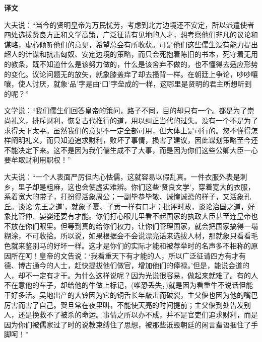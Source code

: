 \documentclass[12pt,UTF-8,openany,a4]{ctexbook}
\begin{document}
\newpage

\begin{Large}
    \noindent\textbf{译文}
\end{Large}


\vspace{1em}

\begin{large}
    \yiwen 
    大夫说：“当今的贤明皇帝为万民忧劳，考虑到北方边境还不安定，所以派遣使者四处选拔贤良方正和文学高策，广泛征请有见地的人才，想考察他们非凡的议论和谋略，虚心倾听他们的意见，希望总会有所收获。可是他们这些儒生没有能力提出超人的计谋和抗击匈奴、安定边境的策略，而只会死抱着陈旧的书本，死守着无用的教条，既不知道什么是该努力做的，什么是该舍弃不做的，也不懂得去适应形势的变化。议论问题无的放矢，就象膝盖痒了却去搔背一样。在朝廷上争论，吵吵嚷嚷，使人讨厌，就象‘品’字是由‘口’字垒成的一样，这哪里是贤明的君主所想听到的呢？”
    
    文学说：“我们儒生们回答皇帝的策问，路子不同，目的却只有一个。都是为了崇尚礼义，排斥财利，恢复古代推行的道，用以纠正当代的过失。没有一个不是为了求得天下太平。虽然我们的意见不一定全部可用，但大体上是可行的。您不懂得怎样阐明礼义，而只知道追求财利，败坏了事情，损害了建议，因此谋划策略至今还不能决定下来。这不是因为我们儒生成不了大事，而是因为你们这些公卿大臣一心要牟取财利用职权！”
    
    大夫说：“一个人表面严厉但内心怯儒，这就容易以假乱真。一件衣服外表是刺乡，里子却是粗麻，这也会使虚实难辨。你们这些‘贤良文学’，穿着宽大的衣服，系着宽大的带子，打扮得活象周公；一副毕恭毕敬、诚惶诚恐的样子，又活象孔丘。谈论‘先王之道’，就象子夏、子贡一样有口才；批评时政，谈论治国之道，好象比管仲、晏婴还要有才能。你们打心眼儿里看不起国家的执政大臣甚至连皇帝也不放在你们眼里。但等到真的给你们权力，让你们管理国家，就会把国家搞得一塌糊涂，不可收拾。所以说，如果根据会不会说漂亮话来选拔人材，那就象只看看毛色就来鉴别马的好坏一样。这才是你们的实际才能和被荐举时的名声多不相称的原因所在呵！皇帝的文告说：‘我看重天下有才能的人，所以广泛征请四方有才有德、博古通今的人士，赶快提拔他们做官，增加他们的俸禄。’但是，能说会道的人，却不一定有才干。为什么这样说呢？因为光说很容易，做起来就难了。有的人不在意他的车子，却给他的牛做上标记，(唯恐丢失，)就是因为看重牛不说话但能干好多活。吴地出产的大铃因为它的铜舌长年敲击而破裂，主父偃也因为他的嘴巴厉害而害了自己。贺旦常在夜里叫，不能使天亮的时间提前；主父偃到处告发别人，还是挽救不了被杀的命运。事情之所以办不成，并不是官吏们追求财利，而是因为你们被儒家过了时的说教束缚住了思想，被那些诋毁朝廷的闲言蜚语捆住了手脚呵！”
    

\end{large}
\end{document}
